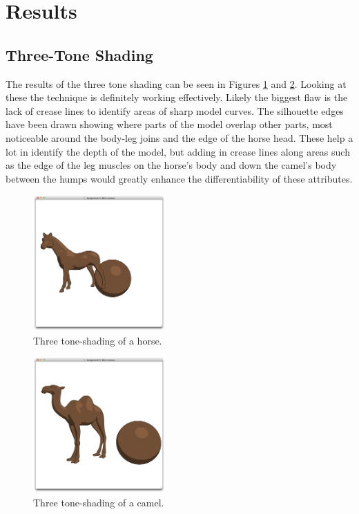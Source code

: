 \section{Results}

  \subsection{Three-Tone Shading}

      The results of the three tone shading can be seen in Figures
      \ref{three-tone-1} and \ref{three-tone-2}.  Looking at these the technique
      is definitely working effectively.  Likely the biggest flaw is the lack of
      crease lines to identify areas of sharp model curves.  The silhouette
      edges have been drawn showing where parts of the model overlap other
      parts, most noticeable around the body-leg joins and the edge of the horse
      head.  These help a lot in identify the depth of the model, but adding in
      crease lines along areas such as the edge of the leg muscles on the
      horse's body and down the camel's body between the humps would greatly
      enhance the differentiability of these attributes.

    \begin{figure}
      \centering
      \includegraphics[width=0.45\textwidth]{images/three-tone-1}
      \caption{Three tone-shading of a horse.}
      \label{three-tone-1}
    \end{figure}

    \begin{figure}
      \centering
      \includegraphics[width=0.45\textwidth]{images/three-tone-2}
      \caption{Three tone-shading of a camel.}
      \label{three-tone-2}
    \end{figure}

